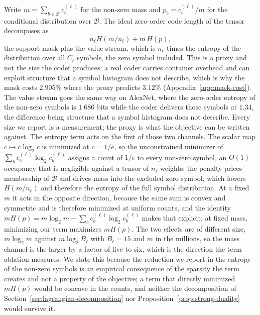 \documentclass{article}
\begin{document}
Write $m=\sum_{b\in\mathcal B}c_b^{(\ell)}$ for the non-zero mass and
$p_b=c_b^{(\ell)}/m$ for the conditional distribution over $\mathcal B$. The
ideal zero-order code length of the tensor decomposes as
\begin{equation}
  n_\ell H\!\left(m/n_\ell\right)+m\,H(p),
  \label{eq:size-decomposition}
\end{equation}
the support mask plus the value stream, which is $n_\ell$ times the entropy of the
distribution over all $C_\ell$ symbols, the zero symbol included. This is a proxy
and not the size the coder produces: a real coder carries container overhead and
can exploit structure that a symbol histogram does not describe, which is why the
mask costs $2.905\%$ where the proxy predicts $3.12\%$
(Appendix~\ref{app:mask-cost}). The value stream goes the same way on AlexNet,
where the zero-order entropy of the non-zero symbols is $1.686$ bits while the
coder delivers those symbols at $1.34$, the difference being structure that a
symbol histogram does not describe. Every size we report is a measurement; the
proxy is what the objective can be written against. The entropy term acts on the first of those two channels. The scalar map $c\mapsto c\log_2c$ is
minimized at $c=1/e$, so the unconstrained minimizer of
$\sum_b c_b^{(\ell)}\log_2c_b^{(\ell)}$ assigns a count of $1/e$ to every non-zero
symbol, an $O(1)$ occupancy that is negligible against a tensor of $n_\ell$
weights: the penalty prices membership of $\mathcal B$ and drives mass
into the excluded zero symbol, which lowers $H(m/n_\ell)$ and therefore the
entropy of the full symbol distribution. At a fixed $m$ it acts in the opposite
direction, because the same sum is convex and symmetric and is therefore minimized
at uniform counts, and the identity
$mH(p)=m\log_2m-\sum_bc_b^{(\ell)}\log_2c_b^{(\ell)}$ makes that explicit: at
fixed mass, minimizing our term maximizes $mH(p)$. The two effects are of
different size, $m\log_2m$ against $m\log_2B_\ell$ with $B_\ell=15$ and $m$ in
the millions, so the mass channel is the larger by a factor of five to six, which
is the direction the term ablation measures. We state this because the reduction we
report in the entropy of the non-zero symbols is an empirical consequence of the
sparsity the term creates and not a property of the objective; a term that
directly minimized $mH(p)$ would be concave in the counts, and neither the
decomposition of Section~\ref{sec:lagrangian-decomposition} nor
Proposition~\ref{prop:strong-duality} would survive it.


\end{document}
